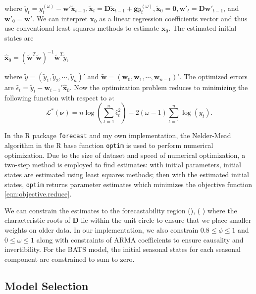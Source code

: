 \documentclass{uwstat572}
\newcommand{\vmadd}[1]{\textbf{\color{red}{#1}}}
\newcommand{\vmcomment}[1]{({\color{blue}{VM's comment:}} \textbf{\color{blue}{#1}})}
\begin{document}
where $ \tilde{y}_t=y_t^{(\omega)}- \textbf{w}' \tilde{\textbf{x}}_{t-1}, \tilde{\textbf{x}}_t=\textbf{D}\tilde{\textbf{x}}_{t-1}+\textbf{g}y_t^{(\omega)}, \tilde{\textbf{x}}_0=\textbf{0}, \textbf{w}'_{t}=\textbf{D}\textbf{w}'_{t-1}$, and $\textbf{w}'_{0}=\textbf{w}'$. We can interpret $\textbf{x}_0$ as a linear regression coefficients vector and thus use conventional least squares methods to estimate $\textbf{x}_0$. The estimated initial states are 
\begin{center}
$\displaystyle \hat{\textbf{x}}_0 = (\tilde{\textbf{w}}^T \tilde{\textbf{w}})^{-1}\tilde{\textbf{w}}^T \tilde{y}$,
\end{center}
where $\tilde{y}=(\tilde{y}_1 ,\tilde{y}_2  , \cdots , \tilde{y}_n )' $ and $\tilde{\textbf{w}}=(\textbf{w}_0 ,\textbf{w}_1  ,\cdots , \textbf{w}_{n-1})'$. The optimized errors are $\hat{\epsilon}_t=\tilde{y}_t-\textbf{w}_{t-1}' \hat{\textbf{x}}_0$. Now the optimization problem reduces to minimizing the following function with respect to $\nu$:
\begin{equation}
\mathcal{L}^{*}(\bm{\nu})=n \log \left(\sum\limits_{t=1}^n \hat{\epsilon}_t^2\right)-2(\omega-1) \sum\limits_{t=1}^n \log(y_t).
\label{eqn:objective.reduce}
\end{equation}

In the R package \texttt{forecast} and my own implementation, the Nelder-Mead algorithm in the R base function \texttt{optim} is used to perform numerical optimization. Due to the size of dataset and speed of numerical optimization, a two-step method is employed to find estimates: with initial parameters, initial states are estimated using least squares methods; then with the estimated initial states, \texttt{optim} returns parameter estimates which minimizes the objective function \ref{eqn:objective.reduce}. 

We can constrain the estimates to the forecastability region (\citet{hyndman2008admissible}), \vmcomment{Fix this reference}\vmadd{,} where the characteristic roots of $\textbf{D}$ lie within the unit circle to ensure that we place smaller weights on older data. In our implementation, we also constrain $0.8\leq \phi \leq 1$ and $0 \leq \omega \leq 1$ along with constraints of ARMA coefficients to ensure causality and invertibility. For the BATS model, the initial seasonal states for each seasonal component are constrained to sum to zero. 

\subsection{Model Selection}
\label{sec:selection}
\end{document}
